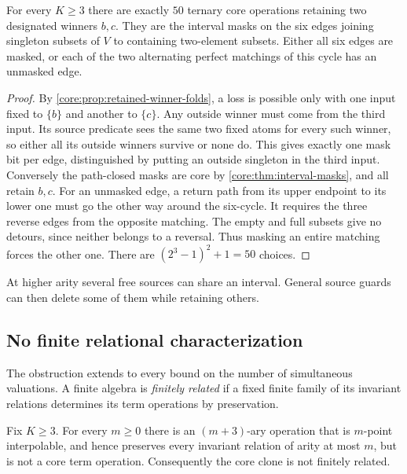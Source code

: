 \begin{corollary}
\label{core:cor:ternary-retained-pair}
For every $K\geq3$ there are exactly $50$ ternary core operations
retaining two designated winners $b,c$. They are the interval masks
on the six edges joining singleton subsets of $V$ to containing
two-element subsets. Either all six edges are masked, or each of the
two alternating perfect matchings of this cycle has an unmasked edge.
\end{corollary}
\begin{proof}
By \cref{core:prop:retained-winner-folds}, a loss is possible only
with one input fixed to $\{b\}$ and another to $\{c\}$. Any outside
winner must come from the third input. Its source predicate sees
the same two fixed atoms for every such winner, so either all its
outside winners survive or none do. This gives exactly one mask
bit per edge, distinguished by putting an outside singleton in the
third input. Conversely the path-closed masks are core by
\cref{core:thm:interval-masks}, and all retain $b,c$.
For an unmasked edge, a return path from its upper endpoint to its
lower one must go the other way around the six-cycle. It requires
the three reverse edges from the opposite matching. The empty and
full subsets give no detours, since neither belongs to a reversal.
Thus masking an entire matching forces the other one. There are
$(2^3-1)^2+1=50$ choices.
\end{proof}

At higher arity several free sources can share an interval. General
source guards can then delete some of them while retaining others.

\subsection{No finite relational characterization}
\label{app:core-crown}

The obstruction extends to every bound on the number of simultaneous
valuations. A finite algebra is \emph{finitely related} if a fixed finite
family of its invariant relations determines its term operations by
preservation.

\begin{theorem}
\label{core:thm:not-finitely-related}
Fix $K\geq3$. For every $m\geq0$ there is an $(m+3)$-ary operation
that is $m$-point interpolable, and hence preserves every invariant
relation of arity at most $m$, but is not a core term operation.
Consequently the core clone is not finitely related.
\end{theorem}

